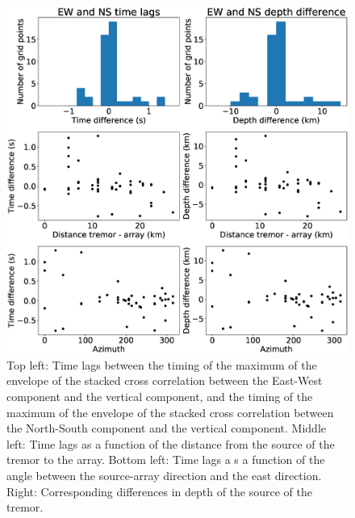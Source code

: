 \documentclass[draft]{agujournal2019}
\begin{document}
\begin{figure}
\noindent\includegraphics[width=\textwidth, trim={0cm 0cm 0cm 0cm},clip]{figures/PWS_PWS.eps}
\caption{Top left: Time lags between the timing of the maximum of the envelope of the stacked cross correlation between the East-West component and the vertical component, and the timing of the maximum of the envelope of the stacked cross correlation between the North-South component and the vertical component. Middle left: Time lags as a function of the distance from the source of the tremor to the array. Bottom left: Time lags a s a function of the angle between the source-array direction and the east direction. Right: Corresponding differences in depth of the source of the tremor.}
\label{pngfiguresample}
\end{figure}
\end{document}

